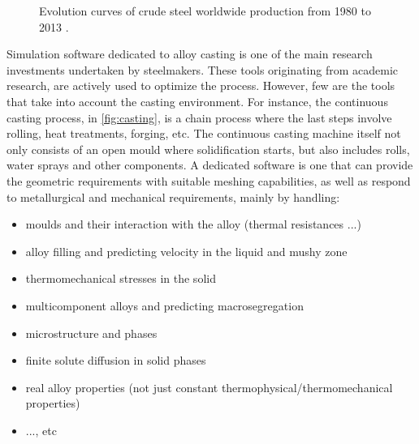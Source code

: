 \begin{figure}[htbp]
\centering
{}
\caption{Evolution curves of crude steel worldwide production from 1980 to 2013 \citep{wsa_world_2014}.}
\label{fig:steel_production}
\end{figure}

Simulation software dedicated to alloy casting is one of the main research investments undertaken by steelmakers. 
These tools originating from academic research, are actively used to optimize the process. 
However, few are the tools that take into account the casting environment. 
For instance, the continuous casting process, in
\cref{fig:casting}, is a chain process where the last steps involve rolling, heat treatments, forging, etc. The continuous casting
machine itself not only consists of an open mould where solidification starts, but also includes rolls, water sprays and other components. 
A dedicated software is one that can provide the geometric requirements with suitable meshing capabilities, 
as well as respond to metallurgical and mechanical requirements, mainly by handling:
%
\begin{itemize}
\itemsep0em
\item moulds and their interaction with the alloy (thermal resistances ...)
\item alloy filling and predicting velocity in the liquid and mushy zone
\item thermomechanical stresses in the solid
\item multicomponent alloys and predicting macrosegregation
\item microstructure and phases
\item finite solute diffusion in solid phases
\item real alloy properties (not just constant thermophysical/thermomechanical properties)
\item ..., etc
\end{itemize}
%
%
